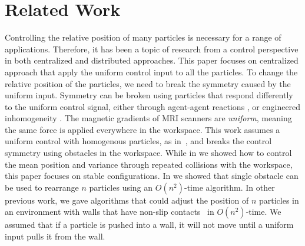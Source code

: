 
\section{Related Work}\label{sec:RelatedWork}

Controlling the relative position of many particles is necessary for a range of applications. Therefore, it has been a topic of research from a control perspective in both centralized and distributed approaches. 
 This paper focuses on centralized approach that apply the uniform control input to all the particles. To change the relative position of the particles, we need to break the symmetry caused by the uniform input.
Symmetry can be broken using particles that respond differently to the uniform control signal, either through agent-agent reactions \cite{bertozzi2015ring}, or engineered inhomogeneity  \cite{Donald2013,bretl2007,beckerIJRR2014}. 
 The magnetic gradients of MRI scanners are \emph{uniform}, meaning the same force is applied everywhere in the workspace\cite{nosrati2018development}.
 This work assumes a uniform control with homogenous particles, as in~\cite{AaronManipulation2013}, and breaks the control symmetry using obstacles in the workspace. 
  While in \cite{shahrokhi2018TRO} we showed how to control the mean position and variance through repeated collisions with the workspace, this paper focuses on stable configurations. 
   In \cite{?UniformManip??} we showed that single obstacle can be used to rearrange $n$ particles using an $O(n^2)$-time algorithm.
   In other previous work, we gave algorithms that could adjust the position of $n$ particles in an environment with walls that have non-slip contacts~\cite{shahrokhi2017} in $O(n^2)$-time. We assumed that if a particle is pushed into a wall, it will not move until a uniform input pulls it from the wall.


